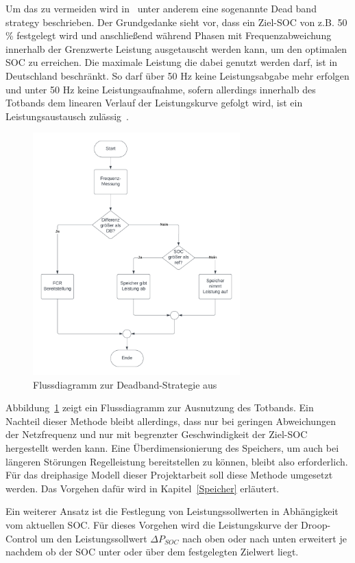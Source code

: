 Um das zu vermeiden wird in~\parencite[]{noauthor_soc_nodate} unter anderem eine sogenannte Dead band strategy beschrieben.
Der Grundgedanke sieht vor, dass ein Ziel-SOC von z.B. 50 \% festgelegt wird und anschließend während Phasen mit 
Frequenzabweichung innerhalb der Grenzwerte Leistung ausgetauscht werden kann, um den optimalen SOC zu erreichen.
Die maximale Leistung die dabei genutzt werden darf, ist in Deutschland beschränkt.
So darf über 50 Hz keine Leistungsabgabe mehr erfolgen und unter 50 Hz keine Leistungsaufnahme,
sofern allerdings innerhalb des Totbands dem linearen Verlauf der Leistungskurve gefolgt wird,
ist ein Leistungsaustausch zulässig~\parencite[]{marchgraber_modellierung_2019}.

\begin{figure}[h!]
    \centering
    \includegraphics[width=8cm]{Abbildungen/DBFlow.png}
    \caption{Flussdiagramm zur Deadband-Strategie aus~\parencite[]{noauthor_soc_nodate}}\label{FlowPCR}
\end{figure}

Abbildung~\ref{FlowPCR} zeigt ein Flussdiagramm zur Ausnutzung des Totbands.
Ein Nachteil dieser Methode bleibt allerdings, dass nur bei geringen Abweichungen der Netzfrequenz und nur mit begrenzter 
Geschwindigkeit der Ziel-SOC hergestellt werden kann. 
Eine Überdimensionierung des Speichers, um auch bei längeren Störungen Regelleistung bereitstellen zu können, bleibt
also erforderlich.
Für das dreiphasige Modell dieser Projektarbeit soll diese Methode umgesetzt werden. 
Das Vorgehen dafür wird in Kapitel~\ref{Speicher} erläutert.

Ein weiterer Ansatz ist die Festlegung von Leistungssollwerten in Abhängigkeit vom aktuellen SOC.
Für dieses Vorgehen wird die Leistungskurve der Droop-Control um den Leistungssollwert $\Delta P_{SOC}$ nach oben
oder nach unten erweitert je nachdem ob der SOC unter oder über dem festgelegten Zielwert liegt.

